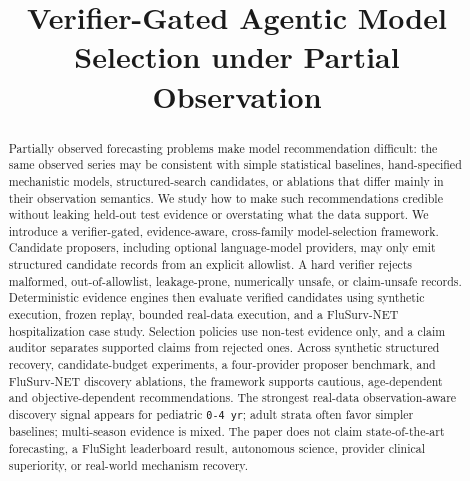 \documentclass[11pt]{article}
\title{Verifier-Gated Agentic Model Selection under Partial Observation}
\author{}
\date{}
\begin{document}
\maketitle

\begin{abstract}
Partially observed forecasting problems make model recommendation difficult:
the same observed series may be consistent with simple statistical baselines,
hand-specified mechanistic models, structured-search candidates, or ablations
that differ mainly in their observation semantics. We study how to make such
recommendations credible without leaking held-out test evidence or overstating
what the data support. We introduce a verifier-gated, evidence-aware,
cross-family model-selection framework. Candidate proposers, including optional
language-model providers, may only emit structured candidate records from an
explicit allowlist. A hard verifier rejects malformed, out-of-allowlist,
leakage-prone, numerically unsafe, or claim-unsafe records. Deterministic
evidence engines then evaluate verified candidates using synthetic execution,
frozen replay, bounded real-data execution, and a FluSurv-NET hospitalization
case study. Selection policies use non-test evidence only, and a claim auditor
separates supported claims from rejected ones. Across synthetic structured
recovery, candidate-budget experiments, a four-provider proposer benchmark, and
FluSurv-NET discovery ablations, the framework supports cautious,
age-dependent and objective-dependent recommendations. The strongest real-data
observation-aware discovery signal appears for pediatric \texttt{0-4 yr};
adult strata often favor simpler baselines; multi-season evidence is mixed.
The paper does not claim state-of-the-art forecasting, a FluSight leaderboard
result, autonomous science, provider clinical superiority, or real-world
mechanism recovery.
\end{abstract}









\end{document}
